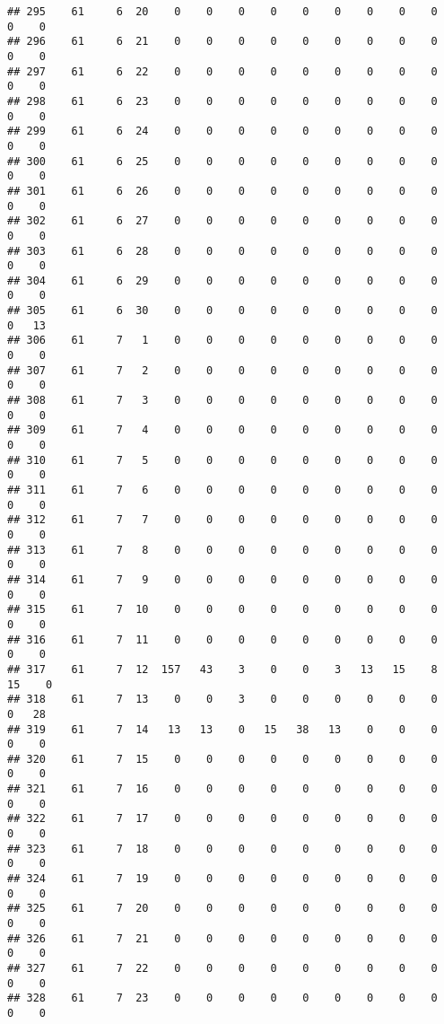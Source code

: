 \documentclass[]{article}
\begin{document}
\begin{verbatim}
## 295    61     6  20    0    0    0    0    0    0    0    0    0    0    0
## 296    61     6  21    0    0    0    0    0    0    0    0    0    0    0
## 297    61     6  22    0    0    0    0    0    0    0    0    0    0    0
## 298    61     6  23    0    0    0    0    0    0    0    0    0    0    0
## 299    61     6  24    0    0    0    0    0    0    0    0    0    0    0
## 300    61     6  25    0    0    0    0    0    0    0    0    0    0    0
## 301    61     6  26    0    0    0    0    0    0    0    0    0    0    0
## 302    61     6  27    0    0    0    0    0    0    0    0    0    0    0
## 303    61     6  28    0    0    0    0    0    0    0    0    0    0    0
## 304    61     6  29    0    0    0    0    0    0    0    0    0    0    0
## 305    61     6  30    0    0    0    0    0    0    0    0    0    0   13
## 306    61     7   1    0    0    0    0    0    0    0    0    0    0    0
## 307    61     7   2    0    0    0    0    0    0    0    0    0    0    0
## 308    61     7   3    0    0    0    0    0    0    0    0    0    0    0
## 309    61     7   4    0    0    0    0    0    0    0    0    0    0    0
## 310    61     7   5    0    0    0    0    0    0    0    0    0    0    0
## 311    61     7   6    0    0    0    0    0    0    0    0    0    0    0
## 312    61     7   7    0    0    0    0    0    0    0    0    0    0    0
## 313    61     7   8    0    0    0    0    0    0    0    0    0    0    0
## 314    61     7   9    0    0    0    0    0    0    0    0    0    0    0
## 315    61     7  10    0    0    0    0    0    0    0    0    0    0    0
## 316    61     7  11    0    0    0    0    0    0    0    0    0    0    0
## 317    61     7  12  157   43    3    0    0    3   13   15    8   15    0
## 318    61     7  13    0    0    3    0    0    0    0    0    0    0   28
## 319    61     7  14   13   13    0   15   38   13    0    0    0    0    0
## 320    61     7  15    0    0    0    0    0    0    0    0    0    0    0
## 321    61     7  16    0    0    0    0    0    0    0    0    0    0    0
## 322    61     7  17    0    0    0    0    0    0    0    0    0    0    0
## 323    61     7  18    0    0    0    0    0    0    0    0    0    0    0
## 324    61     7  19    0    0    0    0    0    0    0    0    0    0    0
## 325    61     7  20    0    0    0    0    0    0    0    0    0    0    0
## 326    61     7  21    0    0    0    0    0    0    0    0    0    0    0
## 327    61     7  22    0    0    0    0    0    0    0    0    0    0    0
## 328    61     7  23    0    0    0    0    0    0    0    0    0    0    0

\end{verbatim}
\end{document}
